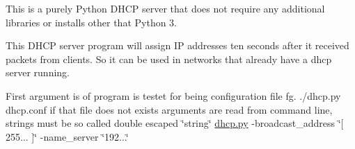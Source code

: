 This is a purely Python DHCP server that does not require any additional libraries or installs other that Python 3.

This DHCP server program will assign IP addresses ten seconds after it received packets from clients. So it can be used in networks that already have a dhcp server running.

First argument is of program is testet for being configuration file fg. ./dhcp.py dhcp.\+conf if that file does not exists arguments are read from command line, strings must be so called double escaped \char`\"{}\textquotesingle{}string\textquotesingle{}\char`\"{} \mbox{\hyperlink{dhcp_8py}{dhcp.\+py}} -\/broadcast\+\_\+address \char`\"{}\mbox{[} \textquotesingle{}255...\textquotesingle{} \mbox{]}\char`\"{} -\/name\+\_\+server \char`\"{}\textquotesingle{}192...\textquotesingle{}\char`\"{} 